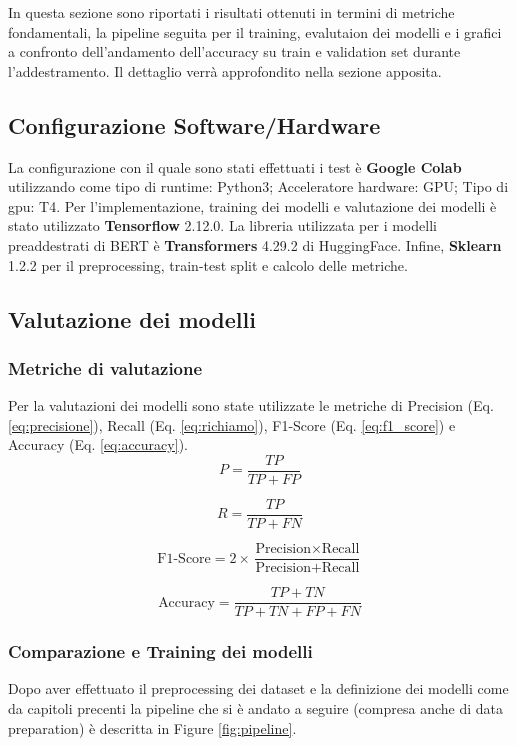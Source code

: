 In questa sezione sono riportati i risultati ottenuti in termini di metriche fondamentali, la pipeline seguita per il training, evalutaion dei modelli e i grafici a confronto dell'andamento dell'accuracy su train e validation set durante l'addestramento. Il dettaglio verrà approfondito nella sezione apposita. 

\subsection{Configurazione Software/Hardware}
La configurazione con il quale sono stati effettuati i test è \textbf{Google Colab} utilizzando come tipo di runtime: Python3; Acceleratore hardware: GPU; Tipo di gpu: T4. Per l'implementazione, training dei modelli e valutazione dei modelli è stato utilizzato \textbf{Tensorflow} 2.12.0. La libreria utilizzata per i modelli preaddestrati di BERT è \textbf{Transformers} 4.29.2 di HuggingFace. Infine, \textbf{Sklearn} 1.2.2 per il preprocessing, train-test split e calcolo delle metriche.  

\subsection{Valutazione dei modelli}
\subsubsection{Metriche di valutazione}
Per la valutazioni dei modelli sono state utilizzate le metriche di Precision (Eq. \ref{eq:precisione}), Recall (Eq. \ref{eq:richiamo}), F1-Score (Eq. \ref{eq:f1_score}) e Accuracy (Eq. \ref{eq:accuracy}).
\begin{equation}
P = \frac{TP}{TP+FP} \label{eq:precisione}
\end{equation}

\begin{equation}
R = \frac{TP}{TP+FN} \label{eq:richiamo}
\end{equation}

\begin{equation}
\text{F1-Score} = 2 \times \frac{\text{Precision} \times \text{Recall}}{\text{Precision} + \text{Recall}} \label{eq:f1_score}
\end{equation}

\begin{equation}
\text{Accuracy} = \frac{TP + TN}{TP + TN + FP + FN} \label{eq:accuracy}
\end{equation}

\subsubsection{Comparazione e Training dei modelli}
Dopo aver effettuato il preprocessing dei dataset e la definizione dei modelli come da capitoli precenti la pipeline che si è andato a seguire 
(compresa anche di data preparation) è descritta in Figure \ref{fig:pipeline}.

